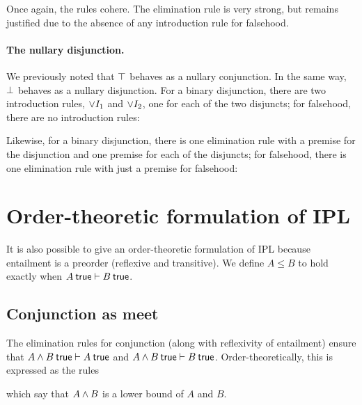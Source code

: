\documentclass[12pt]{article}
\begin{document}
Once again, the rules cohere.
The elimination rule is very strong, but remains justified due to the absence of any introduction rule for falsehood.

\paragraph{The nullary disjunction.}\label{sec:nullary-disjunction}
We previously noted that $\top$ behaves as a nullary conjunction.
In the same way, $\bot$ behaves as a nullary disjunction.
For a binary disjunction, there are two introduction rules, ${\vee}I_1$ and ${\vee}I_2$, one for each of the two disjuncts; for falsehood, there are no introduction rules:
Likewise, for a binary disjunction, there is one elimination rule with a premise for the disjunction and one premise for each of the disjuncts; for falsehood, there is one elimination rule with just a premise for falsehood:

\section{Order-theoretic formulation of \acl{IPL}}\label{sec:ipl_order}

It is also possible to give an order-theoretic formulation of \ac{IPL} because entailment is a preorder (reflexive and transitive).
We define $A \leq B$ to hold exactly when $A \true \entails B \true$.

\subsection{Conjunction as meet}\label{sec:conjunction-as-meet}

The elimination rules for conjunction (along with reflexivity of entailment) ensure that $A \conj B \true \entails A \true$ and $A \conj B \true \entails B \true$.
Order-theoretically, this is expressed as the rules
which say that $A \wedge B$ is a lower bound of $A$ and $B$.
\end{document}
